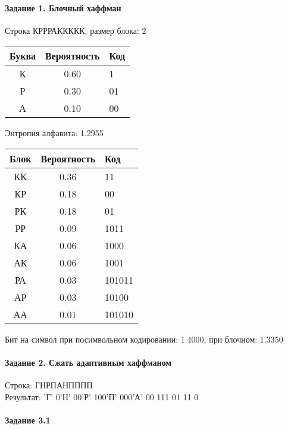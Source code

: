 \documentclass[a4paper, 12pt]{article}
\begin{document}
\paragraph{Задание 1. Блочный хаффман \\}

Строка КРРРАККККК, размер блока: 2
\begin{center}
 \begin{tabular}{ |c|c|l| } 
  \hline
     Буква & Вероятность & Код\\ \hline
К & 0.60 & 1\\\hline
Р & 0.30 & 01\\\hline
А & 0.10 & 00
\\ \hline \end{tabular}
\end{center}
Энтропия алфавита: 1.2955
\begin{center}
 \begin{tabular}{ |c|c|l| } 
  \hline
     Блок & Вероятность & Код\\ \hline
КК & 0.36 & 11\\\hline
КР & 0.18 & 00\\\hline
РК & 0.18 & 01\\\hline
РР & 0.09 & 1011\\\hline
КА & 0.06 & 1000\\\hline
АК & 0.06 & 1001\\\hline
РА & 0.03 & 101011\\\hline
АР & 0.03 & 10100\\\hline
АА & 0.01 & 101010
\\ \hline \end{tabular}
\end{center}
Бит на символ при посимвольном кодировании: 1.4000, при блочном: 1.3350


\pagebreak
\paragraph{Задание 2. Сжать адаптивным хаффманом\\}

Строка: 
ГНРПАНПППП\\
Результат: 'Г' 0'Н' 00'Р' 100'П' 000'А' 00 111 01 11 0










\pagebreak
\paragraph{Задание 3.1}
\end{document}
